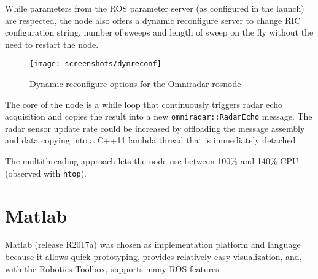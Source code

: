 While parameters from the ROS parameter server (as configured in the
launch) are respected, the node also offers a dynamic reconfigure server
to change RIC configuration string, number of sweeps and length of sweep
on the fly without the need to restart the node.

\begin{figure}[htp]
    \centering
    \label{fig:dynreconf}
    \texttt{[image: screenshots/dynreconf]}
    \caption{Dynamic reconfigure options for the Omniradar rosnode}
\end{figure}

The core of the node is a while loop that continuously triggers radar
echo acquisition and copies the result into a new
\texttt{omniradar::RadarEcho} message. The radar sensor update rate
could be increased by offloading the message assembly and data copying
into a C++11 lambda thread that is immediately detached.

\begin{Shaded}
\begin{Highlighting}[]

\NormalTok{    [=] ()}
\NormalTok{    \{}
\NormalTok{    \}}
\NormalTok{);}
\end{Highlighting}
\end{Shaded}

The multithreading approach lets the node use between 100\% and 140\%
CPU (observed with \texttt{htop}).

\section{Matlab}\label{matlab}

Matlab (release R2017a) was chosen as implementation platform and
language because it allows quick prototyping, provides relatively easy
visualization, and, with the Robotics Toolbox, supports many ROS
features.

